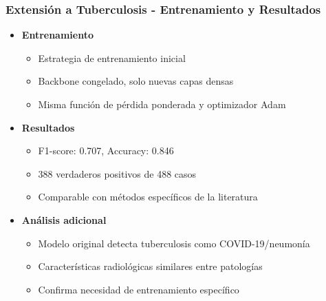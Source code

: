 \begin{frame}
\frametitle{Extensión a Tuberculosis - Entrenamiento y Resultados}
\begin{itemize}
    \item \textbf{Entrenamiento}
    \begin{itemize}
        \item Estrategia de entrenamiento inicial
        \item Backbone congelado, solo nuevas capas densas
        \item Misma función de pérdida ponderada y optimizador Adam
    \end{itemize}
    \item \textbf{Resultados}
    \begin{itemize}
        \item F1-score: 0.707, Accuracy: 0.846
        \item 388 verdaderos positivos de 488 casos
        \item Comparable con métodos específicos de la literatura
    \end{itemize}
    \item \textbf{Análisis adicional}
    \begin{itemize}
        \item Modelo original detecta tuberculosis como COVID-19/neumonía
        \item Características radiológicas similares entre patologías
        \item Confirma necesidad de entrenamiento específico
    \end{itemize}
\end{itemize}
\end{frame}
